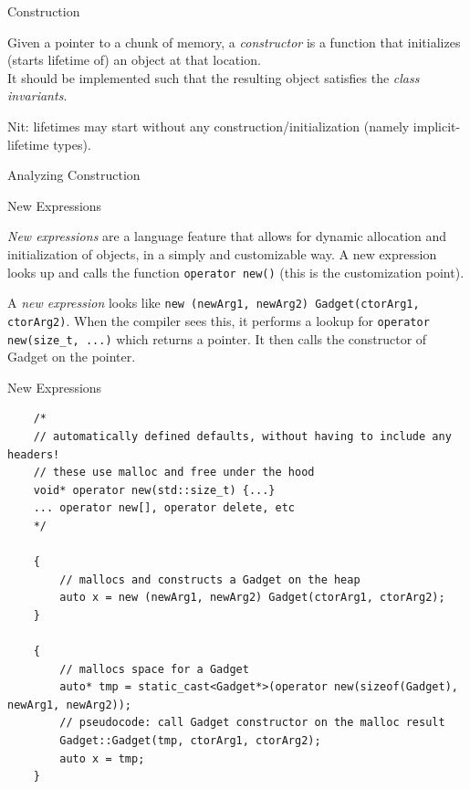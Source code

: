 \begin{frame}[fragile]{Construction}
  \begin{sqt:definition}
    Given a pointer to a chunk of memory, a \emph{constructor} is a function that
    initializes (starts lifetime of) an object at that location.\\
    It should be implemented such that the resulting object satisfies the \emph{class invariants}.
  \end{sqt:definition}

  Nit: lifetimes may start without any construction/initialization (namely implicit-lifetime types).
\end{frame}

\begin{frame}[fragile]{Analyzing Construction}
  
\end{frame}

\begin{frame}[fragile]{New Expressions}
  \begin{sqt:definition}
    \emph{New expressions} are a language feature that allows for dynamic allocation and initialization of objects, in a simply and customizable way.
    A new expression looks up and calls the function \texttt{operator new()} (this is the customization point).
  \end{sqt:definition}

  A \emph{new expression} looks like \texttt{new (newArg1, newArg2) Gadget(ctorArg1, ctorArg2)}.
  When the compiler sees this, it performs a lookup for \texttt{operator new(size_t, ...)} which returns a pointer.
  It then calls the constructor of Gadget on the pointer.
\end{frame}

\begin{frame}[fragile]{New Expressions}
  \begin{verbatim}
    /* 
    // automatically defined defaults, without having to include any headers!
    // these use malloc and free under the hood
    void* operator new(std::size_t) {...}
    ... operator new[], operator delete, etc
    */

    {
        // mallocs and constructs a Gadget on the heap
        auto x = new (newArg1, newArg2) Gadget(ctorArg1, ctorArg2);
    }

    {
        // mallocs space for a Gadget
        auto* tmp = static_cast<Gadget*>(operator new(sizeof(Gadget), newArg1, newArg2));
        // pseudocode: call Gadget constructor on the malloc result
        Gadget::Gadget(tmp, ctorArg1, ctorArg2);
        auto x = tmp;
    }
  \end{verbatim}
\end{frame}

